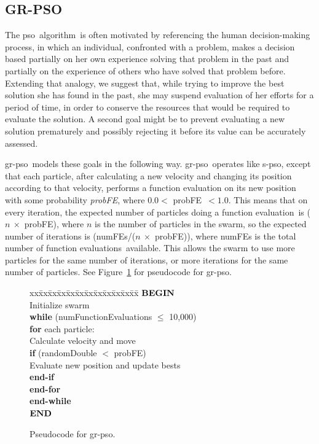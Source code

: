 \documentclass[a4paper,twoside]{article}
\newcommand{\fncevals}{function evaluations}
\newcommand{\fe}{function evaluation}
\newcommand{\pfe}{{probFE}}
\newcommand{\pso}{{\sc pso}}
\newcommand{\spso}{{\sc s-pso}}
\newcommand{\cfe}{{\sc gr-pso}}
\newcommand{\alg}{algorithm}
\begin{document}
\subsection{GR-PSO}

The \pso\ \alg\ is often motivated by referencing the human decision-making process, in which an individual, confronted with a problem, makes a decision based partially on her own experience solving that problem in the past 
and partially on the experience of others who have solved that problem before.
Extending that analogy, we suggest that, while trying to improve the best solution she has found in the past, she may suspend evaluation of her efforts for a period of time, in order to conserve the resources that would be required to evaluate the solution.  A second goal might be to prevent evaluating a new solution prematurely and possibly rejecting it before its value can be accurately assessed.

\cfe\ models these goals in the following way.  \cfe\ operates like \spso, except that each particle, after calculating a new velocity and changing its position according to that velocity, performs a function evaluation on its new position with some probability \emph{\pfe}, where $0.0 <$ \pfe\ $< 1.0$. This means that on every iteration, the expected number of particles doing a \fe\ is ($n \ \times$ \pfe), where $n$ is the number of particles in the swarm, so the expected number of iterations is (numFEs/($n \ \times$ \pfe)), where numFEs is the total number of \fncevals\ available. 
This allows the swarm to use more particles for the same number of iterations, or more iterations for the same number of particles. 
See Figure~\ref{f:pseudocode} for pseudocode for \cfe.


\begin{figure}[h]
\begin{tabbing}
xx\=xx\=xx\=xx\=xx\=xx\=xx\=xx\=xx\=xx\=xx\=xx\=\kill
$\mbox{{\sc {\bf BEGIN}}} $ \\
\> Initialize swarm \\
\> {\bf while} (numFunctionEvaluations $\leq$ 10,000) \\
\> \> {\bf for} each particle: \\
\> \> \> Calculate velocity and move\\
\> \> \> {\bf if} (randomDouble $<$ probFE) \\
\> \> \> \> Evaluate new position and update bests \\
\> \> \> {\bf end-if} \\
\> \> {\bf end-for} \\
\> {\bf end-while}  \\
$\mbox{{\sc {\bf END}}} $ \\
\end{tabbing}
\vspace{-0.25in}
\caption{Pseudocode for \cfe.}
\label{f:pseudocode}
\end{figure}
\end{document}
